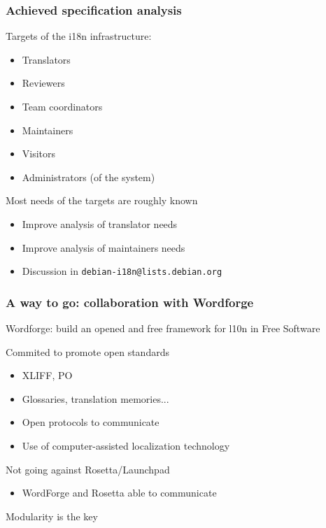\documentclass{beamer}
\begin{document}
\begin{frame}
  \frametitle{Achieved specification analysis}
	\begin{block}
		{Targets of the i18n infrastructure:}
	\begin{itemize}
	\item
		{Translators}
	\item
		{Reviewers}
	\item
		{Team coordinators}
	\item
		{Maintainers}
	\item
		{Visitors}
	\item
		{Administrators (of the system)}
	\end{itemize}
	\end{block}
	\begin{block}
		{Most needs of the targets are roughly known}
	\begin{itemize}
	\item
		{Improve analysis of translator needs}
	\item
		{Improve analysis of maintainers needs}
	\item
		{Discussion in \texttt{debian-i18n@lists.debian.org}}
	\end{itemize}
	\end{block}
\end{frame}

\begin{frame}
  \frametitle{A way to go: collaboration with Wordforge}
	\begin{block}
		{Wordforge: build an opened and free framework for l10n in Free Software}
	\end{block}
	\begin{block}
		{Commited to promote open standards}
	\begin{itemize}
	\item
		{XLIFF, PO}
	\item
		{Glossaries, translation memories...}
	\item
		{Open protocols to communicate}
	\item
		{Use of computer-assisted localization technology}
	\end{itemize}
	\end{block}
	\begin{block}
		{Not going against Rosetta/Launchpad}
	\begin{itemize}
	\item
		{WordForge and Rosetta able to communicate}
	\end{itemize}
	\end{block}
	\begin{block}
		{Modularity is the key}
	\end{block}
\end{frame}
\end{document}
